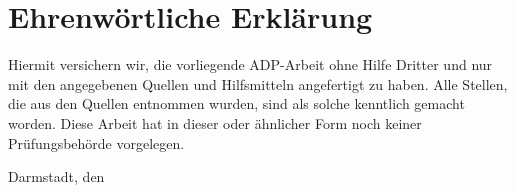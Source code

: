 \section*{Ehrenw\"{o}rtliche Erkl\"{a}rung}	
Hiermit versichern wir, die vorliegende ADP-Arbeit ohne Hilfe Dritter und nur mit den angegebenen Quellen und Hilfsmitteln angefertigt zu haben. Alle Stellen, die aus den Quellen entnommen wurden, sind als solche kenntlich gemacht worden. Diese Arbeit hat in dieser oder \"{a}hnlicher Form noch keiner Pr\"{u}fungsbeh\"{o}rde vorgelegen.
	
\vspace{1.5cm}
	
\noindent Darmstadt, den \fzdSubmissionDate

\vspace{0.5cm}

\noindent\fzdName
